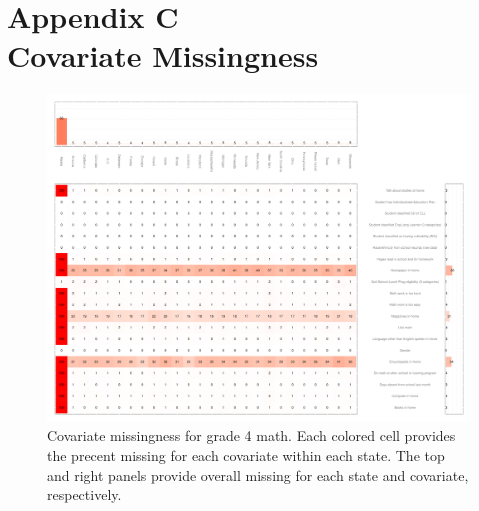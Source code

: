 {}
\section*{Appendix C\\Covariate Missingness}
\label{appendixC}

\begin{figure}[h]
\begin{center}
\includegraphics[width=\textwidth]{../Figures2009/g4math-missing.pdf}
\caption[Covariate missingness for grade 4 math]{Covariate missingness for grade 4 math. Each colored cell provides the precent missing for each covariate within each state. The top and right panels provide overall missing for each state and covariate, respectively.}
\label{fig:g4math:missing}
\end{center}
\end{figure}


